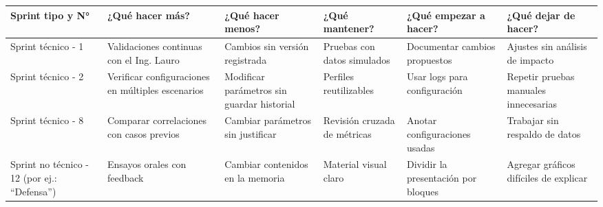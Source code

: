 \documentclass[
11pt, %
]{charter}
\begin{document}
\begin{table}[htpb]
\renewcommand{\arraystretch}{1.4}
\begin{tabular}{|>{\raggedright\arraybackslash}p{1.8cm}|
                >{\raggedright\arraybackslash}p{2.3cm}|
                >{\raggedright\arraybackslash}p{2.3cm}|
                >{\raggedright\arraybackslash}p{2.3cm}|
                >{\raggedright\arraybackslash}p{2.3cm}|
                >{\raggedright\arraybackslash}p{2.3cm}|}
\hline
\rowcolor[HTML]{CCCCCC} 
\textbf{Sprint tipo y N°} & \textbf{¿Qué hacer más?} & \textbf{¿Qué hacer menos?} & \textbf{¿Qué mantener?} & \textbf{¿Qué empezar a hacer?} & \textbf{¿Qué dejar de hacer?} \\
\hline
Sprint técnico - 1 & Validaciones continuas con el Ing. Lauro & Cambios sin versión registrada & Pruebas con datos simulados & Documentar cambios propuestos & Ajustes sin análisis de impacto \\
\hline
Sprint técnico - 2 & Verificar configuraciones en múltiples escenarios & Modificar parámetros sin guardar historial & Perfiles reutilizables & Usar logs para configuración & Repetir pruebas manuales innecesarias \\
\hline
Sprint técnico - 8 & Comparar correlaciones con casos previos & Cambiar parámetros sin justificar & Revisión cruzada de métricas & Anotar configuraciones usadas & Trabajar sin respaldo de datos \\
\hline
Sprint no técnico - 12 (por ej.: ``Defensa'') & Ensayos orales con feedback & Cambiar contenidos en la memoria & Material visual claro & Dividir la presentación por bloques & Agregar gráficos difíciles de explicar \\
\hline
\end{tabular}
\end{table}
\end{document}
